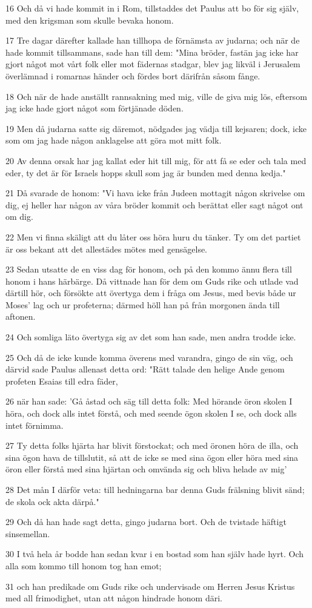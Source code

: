 \par 16 Och då vi hade kommit in i Rom, tillstaddes det Paulus att bo för sig själv, med den krigsman som skulle bevaka honom.
\par 17 Tre dagar därefter kallade han tillhopa de förnämsta av judarna; och när de hade kommit tillsammans, sade han till dem: "Mina bröder, fastän jag icke har gjort något mot vårt folk eller mot fädernas stadgar, blev jag likväl i Jerusalem överlämnad i romarnas händer och fördes bort därifrån såsom fånge.
\par 18 Och när de hade anställt rannsakning med mig, ville de giva mig lös, eftersom jag icke hade gjort något som förtjänade döden.
\par 19 Men då judarna satte sig däremot, nödgades jag vädja till kejsaren; dock, icke som om jag hade någon anklagelse att göra mot mitt folk.
\par 20 Av denna orsak har jag kallat eder hit till mig, för att få se eder och tala med eder, ty det är för Israels hopps skull som jag är bunden med denna kedja."
\par 21 Då svarade de honom: "Vi hava icke från Judeen mottagit någon skrivelse om dig, ej heller har någon av våra bröder kommit och berättat eller sagt något ont om dig.
\par 22 Men vi finna skäligt att du låter oss höra huru du tänker. Ty om det partiet är oss bekant att det allestädes mötes med gensägelse.
\par 23 Sedan utsatte de en viss dag för honom, och på den kommo ännu flera till honom i hans härbärge. Då vittnade han för dem om Guds rike och utlade vad därtill hör, och försökte att övertyga dem i fråga om Jesus, med bevis både ur Moses' lag och ur profeterna; därmed höll han på från morgonen ända till aftonen.
\par 24 Och somliga läto övertyga sig av det som han sade, men andra trodde icke.
\par 25 Och då de icke kunde komma överens med varandra, gingo de sin väg, och därvid sade Paulus allenast detta ord: "Rätt talade den helige Ande genom profeten Esaias till edra fäder,
\par 26 när han sade: 'Gå åstad och säg till detta folk: Med hörande öron skolen I höra, och dock alls intet förstå, och med seende ögon skolen I se, och dock alls intet förnimma.
\par 27 Ty detta folks hjärta har blivit förstockat; och med öronen höra de illa, och sina ögon hava de tillslutit, så att de icke se med sina ögon eller höra med sina öron eller förstå med sina hjärtan och omvända sig och bliva helade av mig'
\par 28 Det mån I därför veta: till hedningarna bar denna Guds frälsning blivit sänd; de skola ock akta därpå."
\par 29 Och då han hade sagt detta, gingo judarna bort. Och de tvistade häftigt sinsemellan.
\par 30 I två hela år bodde han sedan kvar i en bostad som han själv hade hyrt. Och alla som kommo till honom tog han emot;
\par 31 och han predikade om Guds rike och undervisade om Herren Jesus Kristus med all frimodighet, utan att någon hindrade honom däri.


